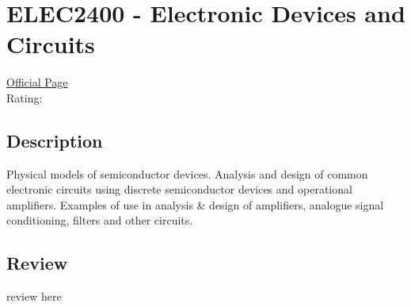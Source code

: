 \hypertarget{ELEC2400}{\section{ELEC2400 - Electronic Devices and Circuits}}

\large
\textcolor{turbo_purple}{\href{https://my.uq.edu.au/programs-courses/course.html?course_code=ELEC2400}{Official Page}} \\
Rating: \cstar\cstar\cstar\cstar\ostar

\normalsize
\subsection*{Description}
Physical models of semiconductor devices.
Analysis and design of common electronic circuits using discrete semiconductor devices and operational amplifiers.
Examples of use in analysis \& design of amplifiers, analogue signal conditioning, filters and other circuits.

\subsection*{Review}
review here
